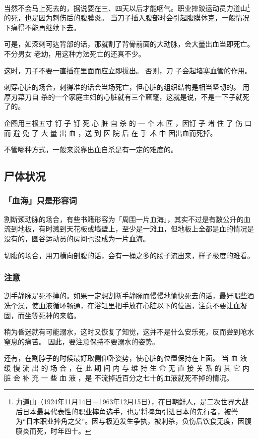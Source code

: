 \documentclass[UTF8]{ctexart}
\begin{document}
当然不会马上死去的，据说要在三、四天以后才能咽气。职业摔跤运动员力道山\footnote{力道山（1924年11月14日－1963年12月15日），在日朝鲜人，是二次世界大战后日本最具代表性的职业摔角选手，也是将摔角引进日本的先行者，被誉为“日本职业摔角之父”。因与极道发生争执，被刺杀，负伤后饮食无度，因腹膜炎而死，时年四十。}的死，也是因为刺伤后的腹膜炎。
当刀子插入腹部时会引起腹膜休克，一般情况下痛得不能再继续下去。

可是，如深刺可达背部的话，那就割了背骨前面的大动脉，会大量出血当即死亡。
不分男女 老幼，用这种方法死亡的还真不少。

这时，刀子不要一直插在里面而应立即拔出。
否则，刀 子会起堵塞血管的作用。 

刺穿心脏的场合，刺得准的话会当场死亡，但心脏的组织结构是相当坚韧的。
用厚刃菜刀自 杀的一个家庭主妇的心脏就有三个窟窿，这就是说，不是一下子就死了的。

企图用三根五寸 钉 子 钉 死 心 脏 自 杀 的 一 个 木 匠 ，因钉 子 堵 住 了 伤 口 而 避 免 了 大 量 出 血 ，送 到 医 院 后 在 手 术 中 因出血而死掉。

不管哪种方式，一般来说靠出血自杀是有一定的难度的。

\subsection{尸体状况}

\subsubsection*{「血海」只是形容词}

割断颈动脉的场合，有些书籍形容为「周围一片血海」，其实不过是有数公升的血流到地板，有时溅到天花板或墙壁上，至少是一滩血，但地板上全都是血的情况是没有的，圆谷运动员的房间也没成为一片血海。

切腹的场合，用刀横向剖腹的话，会有一桶之多的肠子流出来，样子极度的难看。

\subsubsection*{注意}

割手静脉是死不掉的。如果一定想割断手静脉而慢慢地愉快死去的话，最好喝些酒洗个澡，使血液循环畅通，在浴缸里把手放在心脏以下的位置，注意不要让血凝固，而坐等死神的来临。

稍为昏迷就有可能溺水，这时又恢复了知觉，这并不是什么安乐死，反而尝到呛水窒息的痛苦。
因此，要注意保持不要溺水的姿势。

还有，在割脖子的时候最好取侧仰卧姿势，使心脏的位置保持在上面。
当 血 液 缓 慢 流 出 的 场 合 ，在 此 期 间 内 与 维 持 生 命 无 直 接 关 系 的 其 它 内 脏 会 补 充 一 些 血 液 ，是 不流掉近百分之七十的血液就死不掉的情况。
\end{document}
